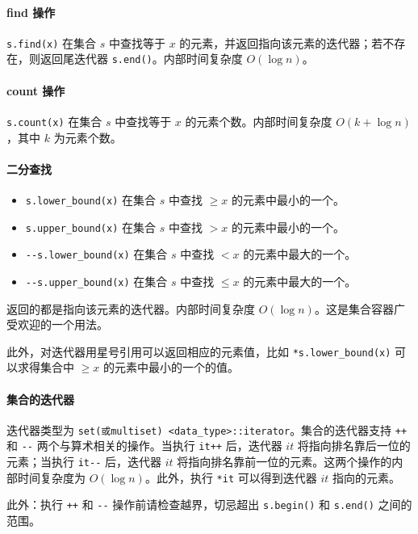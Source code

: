 \documentclass[UTF8]{ctexart}
\newcommand\Emph[1]{\colorbox{green!10}{\textcolor{green!30!black}{#1}}}
\begin{document}
\paragraph{find 操作}
\verb!s.find(x)! 在集合 $s$ 中查找等于 $x$ 的元素，并返回指向该元素的迭代器；若不存在，则返回尾迭代器 \verb!s.end()!。内部时间复杂度 $O(\log n)$。

\paragraph{count 操作}
\verb!s.count(x)! 在集合 $s$ 中查找等于 $x$ 的元素个数。内部时间复杂度 $O(k+\log n)$，其中 $k$ 为元素个数。

\paragraph{二分查找}
\begin{itemize}[itemsep=0pt,parsep=0pt]
    \item \verb!s.lower_bound(x)! 在集合 $s$ 中查找 $\geqslant x$ 的元素中最小的一个。
    \item \verb!s.upper_bound(x)! 在集合 $s$ 中查找 $> x$ 的元素中最小的一个。
    \item \verb!--s.lower_bound(x)! 在集合 $s$ 中查找 $< x$ 的元素中最大的一个。
    \item \verb!--s.upper_bound(x)! 在集合 $s$ 中查找 $\leqslant x$ 的元素中最大的一个。
\end{itemize}
返回的都是指向该元素的\Emph{迭代器}。内部时间复杂度 $O(\log n)$。这是集合容器广受欢迎的一个用法。

此外，对迭代器用星号引用可以返回相应的元素值，比如 \verb!*s.lower_bound(x)! 可以求得集合中 $\geqslant x$ 的元素中最小的一个的值。

\paragraph{集合的迭代器}
迭代器类型为 \verb!set(或multiset) <data_type>::iterator!。集合的迭代器支持 \verb!++! 和 \verb!--! 两个与算术相关的操作。当执行 \verb!it++! 后，迭代器 $it$ 将指向排名靠后一位的元素；当执行 \verb!it--! 后，迭代器 $it$ 将指向排名靠前一位的元素。这两个操作的内部时间复杂度为 $O(\log n)$。此外，执行 \verb!*it! 可以得到迭代器 $it$ 指向的元素。

此外：执行 \verb!++! 和 \verb!--! 操作前请检查越界，切忌超出 \verb!s.begin()! 和 \verb!s.end()! 之间的范围。
\end{document}
